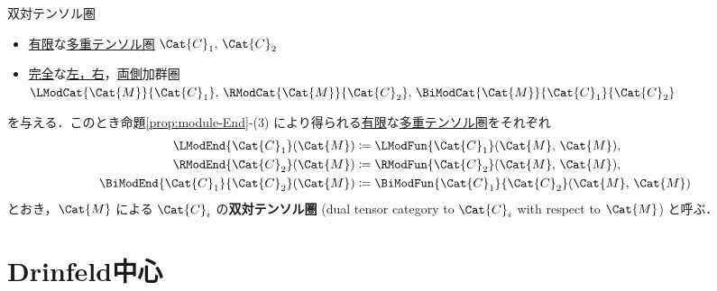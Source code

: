 \documentclass[TQFT_main]{subfiles}
\begin{document}
\begin{mydef}[label=def:module-End]{双対テンソル圏}
    \begin{itemize}
        \item \hyperref[def:finite-abcat]{有限}な\hyperref[def:tensorfusion-cat]{多重テンソル圏} $\Cat{C}_1,\, \Cat{C}_2$
        \item \hyperref[def:modulecat-exact]{完全}な\hyperref[def:modulecat]{左，右}，\hyperref[def:bimodulecat]{両側}加群圏 $\LModCat{\Cat{M}}{\Cat{C}_1},\, \RModCat{\Cat{M}}{\Cat{C}_2},\, \BiModCat{\Cat{M}}{\Cat{C}_1}{\Cat{C}_2}$
    \end{itemize}
    を与える．このとき命題\ref{prop:module-End}-(3) により得られる\hyperref[def:finite-abcat]{有限}な\hyperref[def:tensorfusion-cat]{多重テンソル圏}をそれぞれ
    \begin{align}
        \LModEnd{\Cat{C}_1} (\Cat{M})&\coloneqq \LModFun{\Cat{C}_1} (\Cat{M},\,\Cat{M}), \\
        \RModEnd{\Cat{C}_2} (\Cat{M})&\coloneqq \RModFun{\Cat{C}_2} (\Cat{M},\,\Cat{M}),\\ 
        \BiModEnd{\Cat{C}_1}{\Cat{C}_2} (\Cat{M}) &\coloneqq \BiModFun{\Cat{C}_1}{\Cat{C}_2} (\Cat{M},\, \Cat{M})
    \end{align}
    とおき，$\Cat{M}$ による $\Cat{C}_i$ の\textbf{双対テンソル圏} (dual tensor category to $\Cat{C}_i$ with respect to $\Cat{M}$) と呼ぶ．
\end{mydef}

\section{Drinfeld中心}
\end{document}
